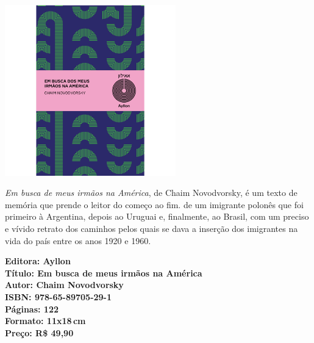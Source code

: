 \begin{center}
\hspace*{-3.6cm}
\hspace*{3.1cm}\includegraphics[width=74mm]{./CAPAS/AYLLON_AMERICA.jpg}
\end{center}
\hspace*{-7cm}\hrulefill\hspace*{-7cm}
\medskip

\noindent{}\textit{Em busca de meus irmãos na América}, de Chaim Novodvorsky, é um texto de memória que prende o leitor do começo ao fim.  de um imigrante polonês que foi primeiro à Argentina, depois ao Uruguai e, finalmente, ao Brasil, com um preciso e vívido retrato dos caminhos pelos quais se dava a inserção dos imigrantes na vida do país entre os anos 1920 e 1960. 

\vfill
\noindent\begin{minipage}[c]{1\linewidth}
{\small\textbf{
\hspace*{-.1cm}Editora: Ayllon\\
Título: Em busca de meus irmãos na América\\
Autor: Chaim Novodvorsky\\ 
ISBN: 978-65-89705-29-1\\
Páginas: 122\\
Formato: 11x18\,cm\\
Preço: R\$ 49,90\\
}}
\end{minipage}
\pagebreak

\vspace*{1.5cm}
\bigskip

